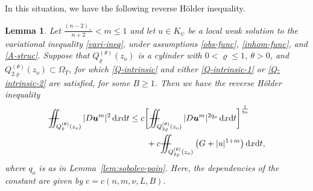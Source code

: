 \documentclass[a4paper, 10pt, american]{amsart}
\newtheorem{lemma}[theorem]{Lemma}
\numberwithin{theorem}{section}
\numberwithin{equation}{section}
\newcommand{\dxdt}{\,\mathrm{d}x\mathrm{d}t}
\renewcommand{\rho}{\varrho}
\newcommand{\power}[2]{\bm{#1^{\mbox{\unboldmath{\scriptsize$#2$}}}}}
\def\Xiint#1{\mathchoice
    {\XXiint\displaystyle\textstyle{#1}}%
    {\XXiint\textstyle\scriptstyle{#1}}%
    {\XXiint\scriptstyle\scriptscriptstyle{#1}}%
    {\XXiint\scriptscriptstyle\scriptscriptstyle{#1}}%
    \!\iint}
\def\XXiint#1#2#3{\setbox0=\hbox{$#1{#2#3}{\iint}$}
    \vcenter{\hbox{$#2#3$}}\kern-0.5\wd0}
\def\biint{\Xiint{-\!-}}
\begin{document}
In this situation, we have the following reverse H\"older inequality.
\begin{lemma}\label{lem:reverseHolder}
Let $\frac{(n-2)_+}{n+2}<m\le1$ and let $u\in K_\psi$ be a local weak
solution to the variational inequality \eqref{vari-ineq}, under
assumptions \eqref{obs-func}, \eqref{inhom-func}, and \eqref{A-struc}. 
Suppose that $Q_{\rho}^{(\theta)}(z_o)$ is a cylinder with
$0<\rho\le1$, $\theta>0$, and
$Q_{2\rho}^{(\theta)}(z_o)\subset\Omega_T$, for which
\eqref{Q-intrinsic} and either \eqref{Q-intrinsic-1} or
\eqref{Q-intrinsic-2} are satisfied, for some $B\ge1$.
Then we have the reverse H\"older inequality
\begin{align}
\nonumber
\biint_{Q_\rho^{(\theta)}(z_o)}|D\power um|^2\dxdt
&\le
c\bigg[\biint_{Q_{2\rho}^{(\theta)}(z_o)} |D\power um|^{2{q_o}} \dxdt\bigg]^\frac1{q_o}\\\nonumber
&\qquad+
c\biint_{Q_{2\rho}^{(\theta)}(z_o)}\big(G+|u|^{1+m}\big)\dxdt,
\end{align}
where $q_o$ is as in Lemma~\ref{lem:sobolev-poin}.
Here, the dependencies of the constant are given by $c=c(n,m,\nu,L,B)$.
\end{lemma}
\end{document}

